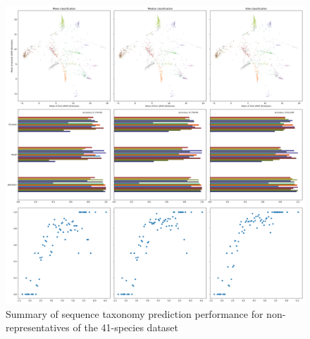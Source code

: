 \documentclass{article}
\begin{document}
\begin{figure}
  \includegraphics[width=\linewidth]{new_journal/figures/ar122_r89.genomic.medium/chunks_W4000_S4000/roznet/o256_g4_b32_lr0.001_16bit_A4/nonrep/summary.aggregated.png}
  \caption{Summary of sequence taxonomy prediction performance for non-representatives of the 41-species dataset}
  \label{fig:summary_aggregated_roznet_medium_nonrep}
\end{figure}
\end{document}
